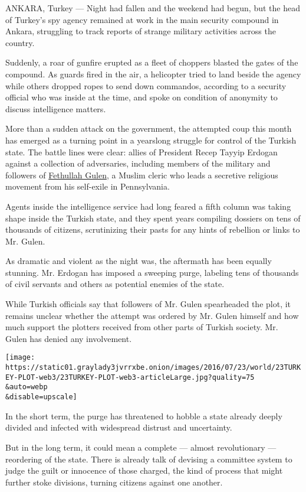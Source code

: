ANKARA, Turkey --- Night had fallen and the weekend had begun, but the
head of Turkey's spy agency remained at work in the main security
compound in Ankara, struggling to track reports of strange military
activities across the country.

Suddenly, a roar of gunfire erupted as a fleet of choppers blasted the
gates of the compound. As guards fired in the air, a helicopter tried to
land beside the agency while others dropped ropes to send down
commandos, according to a security official who was inside at the time,
and spoke on condition of anonymity to discuss intelligence matters.

More than a sudden attack on the government, the attempted coup this
month has emerged as a turning point in a yearslong struggle for control
of the Turkish state. The battle lines were clear: allies of President
Recep Tayyip Erdogan against a collection of adversaries, including
members of the military and followers of
\href{https://www.nytimes3xbfgragh.onion/2016/07/20/world/europe/fethullah-gulen-erdogan-extradition.html}{Fethullah
Gulen}, a Muslim cleric who leads a secretive religious movement from
his self-exile in Pennsylvania.

Agents inside the intelligence service had long feared a fifth column
was taking shape inside the Turkish state, and they spent years
compiling dossiers on tens of thousands of citizens, scrutinizing their
pasts for any hints of rebellion or links to Mr. Gulen.

As dramatic and violent as the night was, the aftermath has been equally
stunning. Mr. Erdogan has imposed a sweeping purge, labeling tens of
thousands of civil servants and others as potential enemies of the
state.

While Turkish officials say that followers of Mr. Gulen spearheaded the
plot, it remains unclear whether the attempt was ordered by Mr. Gulen
himself and how much support the plotters received from other parts of
Turkish society. Mr. Gulen has denied any involvement.

\texttt{[image: https://static01.graylady3jvrrxbe.onion/images/2016/07/23/world/23TURKEY-PLOT-web3/23TURKEY-PLOT-web3-articleLarge.jpg?quality=75\\\&auto=webp\\\&disable=upscale]}

In the short term, the purge has threatened to hobble a state already
deeply divided and infected with widespread distrust and uncertainty.

But in the long term, it could mean a complete --- almost revolutionary
--- reordering of the state. There is already talk of devising a
committee system to judge the guilt or innocence of those charged, the
kind of process that might further stoke divisions, turning citizens
against one another.

